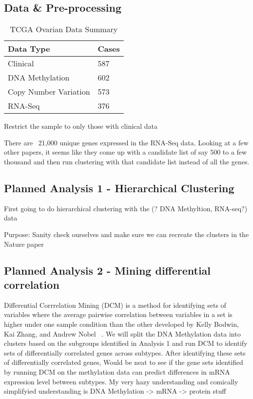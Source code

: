 \documentclass{article}
\begin{document}
\subsection{Data \& Pre-processing}

\begin{table}[h!] \centering
  \begin{tabular}{ll} \toprule
  Data Type & Cases \\
  \hline
  Clinical & 587 \\
  DNA Methylation & 602 \\
  Copy Number Variation & 573 \\
  RNA-Seq & 376 \\
  \bottomrule
  \end{tabular}
\caption{TCGA Ovarian Data Summary}
\end{table}

Restrict the sample to only those with clinical data

There are ~21,000 unique genes expressed in the RNA-Seq data. Looking at a few other papers, it seems like they come up with a candidate list of say 500 to a few thousand and then run clustering with that candidate list instead of all the genes. 

\subsection{Planned Analysis 1 - Hierarchical Clustering}

First going to do hierarchical clustering with the (? DNA Methyltion, RNA-seq?) data \cite{eisen_cluster_1998}

Purpose: Sanity check ourselves and make sure we can recreate the clusters in the Nature paper \cite{cancer2011integrated}

\subsection{Planned Analysis 2 - Mining differential correlation} 
Differential Corrrelation Mining (DCM) is a method for identifying sets of variables where the average pairwise correlation between variables in a set is higher under one sample condition
than the other developed by Kelly Bodwin, Kai Zhang, and Andrew Nobel ~\cite{difcor2016}. We will split the DNA Methylation data into clusters based on the subgroups identified in Analysis 1 and run DCM to identify sets of differentially correlated genes across subtypes. 
  After identifying these sets of differentially correlated genes, 
Would be neat to see if the gene sets identified by running DCM on the methylation data can predict differences in mRNA expression level between subtypes. My very hazy understanding and comically simplifyied understanding is DNA Methylation -> mRNA -> protein stuff 
\end{document}
